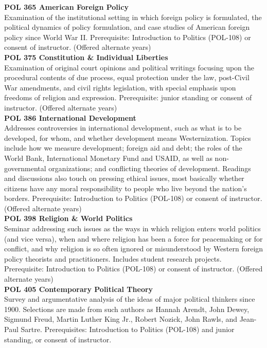 \documentclass[
  letterpaper,
]{scrbook}
\begin{document}
\textbf{POL 365 American Foreign Policy}\\
Examination of the institutional setting in which foreign policy is
formulated, the political dynamics of policy formulation, and case
studies of American foreign policy since World War II. Prerequisite:
Introduction to Politics (POL-108) or consent of instructor. (Offered
alternate years)\\
\textbf{POL 375 Constitution \& Individual Liberties}\\
Examination of original court opinions and political writings focusing
upon the procedural contents of due process, equal protection under the
law, post-Civil War amendments, and civil rights legislation, with
special emphasis upon freedoms of religion and expression. Prerequisite:
junior standing or consent of instructor. (Offered alternate years)\\
\textbf{POL 386 International Development}\\
Addresses controversies in international development, such as what is to
be developed, for whom, and whether development means Westernization.
Topics include how we measure development; foreign aid and debt; the
roles of the World Bank, International Monetary Fund and USAID, as well
as non-governmental organizations; and conflicting theories of
development. Readings and discussions also touch on pressing ethical
issues, most basically whether citizens have any moral responsibility to
people who live beyond the nation's borders. Prerequisite: Introduction
to Politics (POL-108) or consent of instructor. (Offered alternate
years)\\
\textbf{POL 398 Religion \& World Politics}\\
Seminar addressing such issues as the ways in which religion enters
world politics (and vice versa), when and where religion has been a
force for peacemaking or for conflict, and why religion is so often
ignored or misunderstood by Western foreign policy theorists and
practitioners. Includes student research projects. Prerequisite:
Introduction to Politics (POL-108) or consent of instructor. (Offered
alternate years)\\
\textbf{POL 405 Contemporary Political Theory}\\
Survey and argumentative analysis of the ideas of major political
thinkers since 1900. Selections are made from such authors as Hannah
Arendt, John Dewey, Sigmund Freud, Martin Luther King Jr., Robert
Nozick, John Rawls, and Jean-Paul Sartre. Prerequisites: Introduction to
Politics (POL-108) and junior standing, or consent of instructor.\\
\end{document}
